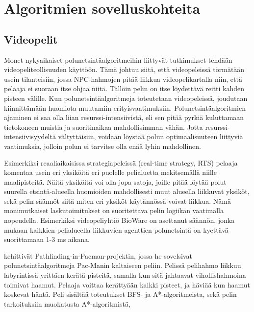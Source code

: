 \chapter{Algoritmien sovelluskohteita} \label{algoritmienSovelluskohteita}

\section{Videopelit}\label{videopelit}
Monet nykyaikaiset polunetsintäalgoritmeihin liittyvät tutkimukset tehdään 
videopeliteollisuuden 
käyttöön\cite{MathewAndMalathy}\cite{ACMHindawi}\cite{mazeGameTrilogi}. 
Tämä johtuu siitä, että videopeleissä törmätään usein tilanteisiin, jossa 
NPC-hahmojen pitää liikkua videopelikartalla niin, että pelaaja ei suoraan 
itse ohjaa niitä. Tällöin pelin on itse löydettävä reitti kahden pisteen 
välille. Kun polunetsintäalgoritmeja toteutetaan videopeleissä, joudutaan 
kiinnittämään huomiota muutamiin erityisvaatimuksiin. Polunetsintäalgoritmien 
ajaminen ei saa olla liian resurssi-intensiivistä, eli sen pitää pyrkiä 
kuluttamaan tietokoneen muistia ja suoritinaikaa mahdollisimman vähän. Jotta 
resurssi-intensiivisyydeltä vältyttäisiin, voidaan löystää polun 
optimaalisuuteen liittyviä vaatimuksia, jolloin polun ei tarvitse olla enää 
lyhin mahdollinen\cite{MathewAndMalathy}.\par
	Esimerkiksi reaaliaikaisissa strategiapeleissä (real-time strategy, 
RTS) pelaaja komentaa usein eri yksiköitä eri puolelle pelialuetta 
mekitsemällä niille maalipisteitä. Näitä yksiköitä voi olla jopa satoja, 
joille pitää löytää polut suurella etsintä-alueella huomioiden mahdollisesti 
muut alueella liikkuvat yksiköt, sekä pelin säännöt siitä miten eri 
yksiköt käytännössä voivat liikkua\cite{pPacman}\cite{MathewAndMalathy}. 
Nämä monimutkaiset laskutoimitukset on suoritettava pelin logiikan 
vaatimalla nopeudella. Esimerkiksi videopeliyhtiö BioWare on asettanut 
säännön, jonka mukaan kaikkien pelialueella liikkuvien agenttien polunetsintä 
on kyettävä suorittamaan 1-3 ms aikana\cite{pPacman}.\par
	\textcite{pPacman} kehittivät Pathfinding-in-Pacman-projektin, jossa 
he sovelsivat polunetsintäalgoritmeja Pac-Manin kaltaiseen peliin. Pelissä 
pelihahmo liikkuu labyrintissä yrittäen kerätä pisteitä, samalla kun sitä 
jahtaavat vihollishahmoina toimivat haamut. Pelaaja voittaa kerättyään kaikki 
pisteet, ja häviää kun haamut koskevat häntä. Peli sisältää toteutukset BFS- 
ja A*-algoritmeista, sekä pelin tarkoituksiin muokatusta A*-algoritmistä, 
